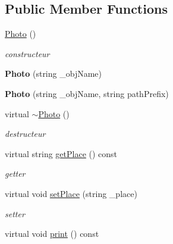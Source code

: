 \subsection*{Public Member Functions}
\begin{DoxyCompactItemize}
\item 
\hypertarget{classPhoto_a10ef03ede9235052eb9f7d5e950f85d3}{\hyperlink{classPhoto_a10ef03ede9235052eb9f7d5e950f85d3}{Photo} ()}\label{classPhoto_a10ef03ede9235052eb9f7d5e950f85d3}

\begin{DoxyCompactList}\small\item\em constructeur \end{DoxyCompactList}\item 
\hypertarget{classPhoto_aa8b1ff45e4ce396b16feed0359fee5d1}{{\bfseries Photo} (string \-\_\-obj\-Name)}\label{classPhoto_aa8b1ff45e4ce396b16feed0359fee5d1}

\item 
\hypertarget{classPhoto_a34c737e6e1f77dc9d3ba7e03bfad11bb}{{\bfseries Photo} (string \-\_\-obj\-Name, string path\-Prefix)}\label{classPhoto_a34c737e6e1f77dc9d3ba7e03bfad11bb}

\item 
\hypertarget{classPhoto_adc366234be6226600360c7cbba8e7fcf}{virtual \hyperlink{classPhoto_adc366234be6226600360c7cbba8e7fcf}{$\sim$\-Photo} ()}\label{classPhoto_adc366234be6226600360c7cbba8e7fcf}

\begin{DoxyCompactList}\small\item\em destructeur \end{DoxyCompactList}\item 
\hypertarget{classPhoto_a412f7dfbfe6c1bb6ef19d3d0067322d5}{virtual string \hyperlink{classPhoto_a412f7dfbfe6c1bb6ef19d3d0067322d5}{get\-Place} () const }\label{classPhoto_a412f7dfbfe6c1bb6ef19d3d0067322d5}

\begin{DoxyCompactList}\small\item\em getter \end{DoxyCompactList}\item 
\hypertarget{classPhoto_ab01ceff1921d80a260659f775b7d68e9}{virtual void \hyperlink{classPhoto_ab01ceff1921d80a260659f775b7d68e9}{set\-Place} (string \-\_\-place)}\label{classPhoto_ab01ceff1921d80a260659f775b7d68e9}

\begin{DoxyCompactList}\small\item\em setter \end{DoxyCompactList}\item 
\hypertarget{classPhoto_a172eee7d20b6852a4bc2c4ec5494610f}{virtual void \hyperlink{classPhoto_a172eee7d20b6852a4bc2c4ec5494610f}{print} () const }\label{classPhoto_a172eee7d20b6852a4bc2c4ec5494610f}


\end{DoxyCompactItemize}
